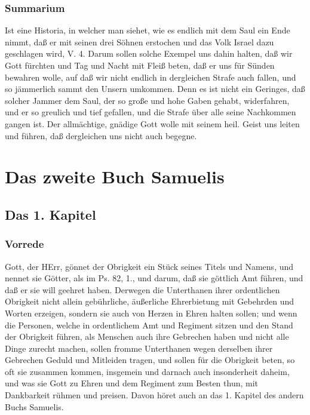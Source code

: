 \section{Summarium}

Ist eine Historia, in welcher man siehet, wie es endlich mit dem Saul ein Ende nimmt, daß er mit seinen drei Söhnen erstochen und das Volk Israel dazu geschlagen wird, V. 4. Darum sollen solche Exempel uns dahin halten, daß wir Gott fürchten und Tag und Nacht mit Fleiß beten, daß er uns für Sünden bewahren wolle, auf daß wir nicht endlich in dergleichen Strafe auch fallen, und so jämmerlich sammt den Unsern umkommen. Denn es ist nicht ein Geringes, daß solcher Jammer dem Saul, der so große und hohe Gaben gehabt, widerfahren, und er so greulich und tief gefallen, und die Strafe über alle seine Nachkommen gangen ist. Der allmächtige, gnädige Gott wolle mit seinem heil. Geist uns leiten und führen, daß dergleichen uns nicht auch begegne.

\part{Das zweite Buch Samuelis}

\chapter{Das 1. Kapitel}

\section{Vorrede}

Gott, der HErr, gönnet der Obrigkeit ein Stück seines Titels und Namens, und nennet sie Götter, als im Ps. 82, 1., und darum, daß sie göttlich Amt führen, und daß er sie will geehret haben. Derwegen die Unterthanen ihrer ordentlichen Obrigkeit nicht allein gebührliche, äußerliche Ehrerbietung mit Gebehrden und Worten erzeigen, sondern sie auch von Herzen in Ehren halten sollen; und wenn die Personen, welche in ordentlichem Amt und Regiment sitzen und den Stand der Obrigkeit führen, als Menschen auch ihre Gebrechen haben und nicht alle Dinge zurecht machen, sollen fromme Unterthanen wegen derselben ihrer Gebrechen Geduld und Mitleiden tragen, und sollen für die Obrigkeit beten, so oft sie zusammen kommen, insgemein und darnach auch insonderheit daheim, und was sie Gott zu Ehren und dem Regiment zum Besten thun, mit Dankbarkeit rühmen und preisen. Davon höret auch an das 1. Kapitel des andern Buchs Samuelis.

